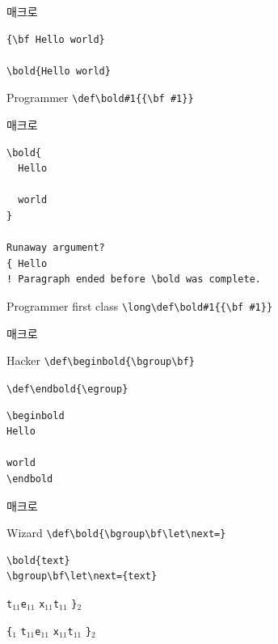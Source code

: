 \documentclass{beamer}
\begin{document}
%
\begin{frame}[fragile]{\texttt{\string\bold} 매크로}
\begin{Verbatim}[fontsize=\small, formatcom=\color{blue}]
{\bf Hello world}
    
\bold{Hello world}
\end{Verbatim}
  \begin{alertblock}{Programmer}
    \verb+\def\bold#1{{\bf #1}}+
  \end{alertblock}
\end{frame}


%
\begin{frame}[fragile]{\texttt{\string\bold} 매크로}
\begin{Verbatim}[fontsize=\small, formatcom=\color{blue}]
\bold{
  Hello

  world
}

Runaway argument?
{ Hello
! Paragraph ended before \bold was complete.
\end{Verbatim}
  \begin{alertblock}{Programmer first class}
    \verb+\long\def\bold#1{{\bf #1}}+
  \end{alertblock}
\end{frame}


%
\begin{frame}[fragile]{\texttt{\string\bold} 매크로}
  \begin{alertblock}{Hacker}
    \verb+\def\beginbold{\bgroup\bf}+
    
    \verb+\def\endbold{\egroup}+
  \end{alertblock}

\begin{Verbatim}[fontsize=\small, formatcom=\color{blue}]
\beginbold
Hello

world
\endbold
\end{Verbatim}
\end{frame}


%
\begin{frame}[fragile]{\texttt{\string\bold} 매크로}
  \begin{alertblock}{Wizard}
    \verb+\def\bold{\bgroup\bf\let\next=}+
  \end{alertblock}

\begin{Verbatim}[fontsize=\small, formatcom=\color{blue}]
\bold{text}
\bgroup\bf\let\next={text}
\end{Verbatim}


\bigskip

  \quad{}\quad
  \verb|t|$_{11}$\quad\verb|e|$_{11}$\quad
  \verb|x|$_{11}$\quad\verb|t|$_{11}$\quad
  \verb|}|$_{2}$

  \verb|{|$_1$\quad{}\quad
  \verb|t|$_{11}$\quad\verb|e|$_{11}$\quad
  \verb|x|$_{11}$\quad\verb|t|$_{11}$\quad
  \verb|}|$_{2}$
\end{frame}
\end{document}
